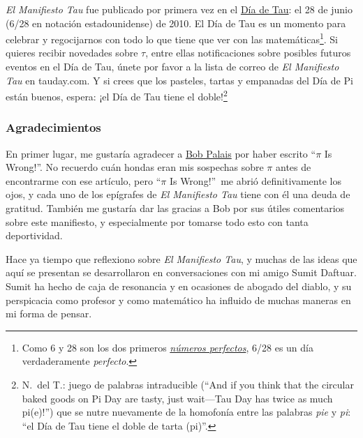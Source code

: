 \emph{El Manifiesto Tau} fue publicado por primera vez en el \href{http://tauday.com/}{Día de Tau}: el 28 de junio (6/28 en notación estadounidense) de 2010. El Día de Tau es un momento para celebrar y regocijarnos con todo lo que tiene que ver con las matemáticas\footnote{Como 6 y 28 son los dos primeros \href{https://es.wikipedia.org/wiki/Número_perfecto}{\emph{números perfectos}}, 6/28 es un día verdaderamente \emph{perfecto}.}. Si quieres recibir novedades sobre $\tau$, entre ellas notificaciones sobre posibles futuros eventos en el Día de Tau, únete por favor a la lista de correo de \emph{El Manifiesto Tau} en tauday.com. Y si crees que los pasteles, tartas y empanadas del Día de Pi están buenos, espera: ¡el Día de Tau tiene el doble!\footnote{N.~del T.: juego de palabras intraducible (``And if you think that the circular baked goods on Pi Day are tasty, just wait---Tau Day has twice as much pi(e)!'') que se nutre nuevamente de la homofonía entre las palabras \emph{pie} y \emph{pi}: ``el Día de Tau tiene el doble de tarta (pi)''.}



\renewcommand{\thesubsubsection}{6.283}

  \subsubsection{Agradecimientos} %
  \label{sec:acknowledgments}

En primer lugar, me gustaría agradecer a \href{http://www.math.utah.edu/~palais}{Bob Palais} por haber escrito ``$\pi$ Is Wrong!''. No recuerdo cuán hondas eran mis sospechas sobre $\pi$ antes de encontrarme con ese artículo, pero ``$\pi$ Is Wrong!''\ me abrió definitivamente los ojos, y cada uno de los epígrafes de \emph{El Manifiesto Tau} tiene con él una deuda de gratitud. También me gustaría dar las gracias a Bob por sus útiles comentarios sobre este manifiesto, y especialmente por tomarse todo esto con tanta deportividad.

Hace ya tiempo que reflexiono sobre \emph{El Manifiesto Tau}, y muchas de las ideas que aquí se presentan se desarrollaron en conversaciones con mi amigo Sumit Daftuar. Sumit ha hecho de caja de resonancia y en ocasiones de abogado del diablo, y su perspicacia como profesor y como matemático ha influido de muchas maneras en mi forma de pensar.

